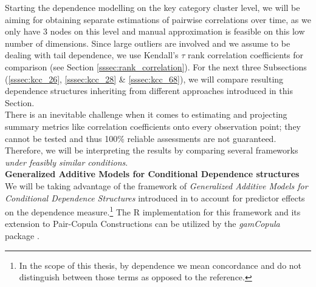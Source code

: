 
Starting the dependence modelling on the key category cluster level, we will be aiming for obtaining separate estimations of pairwise correlations over time, as we only have 3 nodes on this level and manual approximation is feasible on this low number of dimensions. Since large outliers are involved and we assume to be dealing with tail dependence, we use Kendall's $\tau$ rank correlation coefficients for comparison (see Section \ref{sssec:rank_correlation}). For the next three Subsections (\ref{sssec:kcc_26}, \ref{sssec:kcc_28} \& \ref{sssec:kcc_68}), we will compare resulting dependence structures inheriting from different approaches introduced in this Section.\\

There is an inevitable challenge when it comes to estimating and projecting summary metrics like correlation coefficients onto every observation point; they cannot be tested and thus 100\% reliable assessments are not guaranteed. Therefore, we will be interpreting the results by comparing several frameworks \textit{under feasibly similar conditions}.\\


\textbf{Generalized Additive Models for Conditional Dependence structures}\\
We will be taking advantage of the framework of \textit{Generalized Additive Models for Conditional Dependence Structures} introduced in \cite{vatter2015generalized} to account for predictor effects on the dependence measure.\footnote{In the scope of this thesis, by dependence we mean concordance and do not distinguish between those terms as opposed to the reference.} The R implementation for this framework and its extension to Pair-Copula Constructions \citep{vatter2018generalized} can be utilized by the \textit{gamCopula} package \citep{vatter2019gamcopula}. \\


